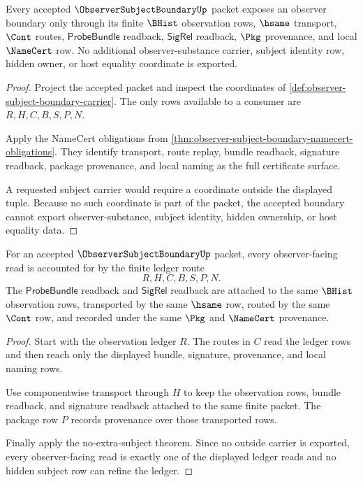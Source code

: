 \begin{theorem}
\label{thm:observer-subject-boundary-no-extra-subject}
Every accepted $\ObserverSubjectBoundaryUp$ packet exposes an observer boundary only through its finite $\BHist$ observation rows, $\hsame$ transport, $\Cont$ routes, $\mathsf{ProbeBundle}$ readback, $\mathsf{SigRel}$ readback, $\Pkg$ provenance, and local $\NameCert$ row. No additional observer-substance carrier, subject identity row, hidden owner, or host equality coordinate is exported.
\end{theorem}
\begin{proof}
Project the accepted packet and inspect the coordinates of \autoref{def:observer-subject-boundary-carrier}. The only rows available to a consumer are $R,H,C,B,S,P,N$.

Apply the NameCert obligations from \autoref{thm:observer-subject-boundary-namecert-obligations}. They identify transport, route replay, bundle readback, signature readback, package provenance, and local naming as the full certificate surface.

A requested subject carrier would require a coordinate outside the displayed tuple. Because no such coordinate is part of the packet, the accepted boundary cannot export observer-substance, subject identity, hidden ownership, or host equality data.
\end{proof}

\begin{theorem}
\label{thm:observer-subject-boundary-ledger-exactness}
For an accepted $\ObserverSubjectBoundaryUp$ packet, every observer-facing read is accounted for by the finite ledger route
$$
R,H,C,B,S,P,N.
$$
The $\mathsf{ProbeBundle}$ readback and $\mathsf{SigRel}$ readback are attached to the same $\BHist$ observation rows, transported by the same $\hsame$ row, routed by the same $\Cont$ row, and recorded under the same $\Pkg$ and $\NameCert$ provenance.
\end{theorem}
\begin{proof}
Start with the observation ledger $R$. The routes in $C$ read the ledger rows and then reach only the displayed bundle, signature, provenance, and local naming rows.

Use componentwise transport through $H$ to keep the observation rows, bundle readback, and signature readback attached to the same finite packet. The package row $P$ records provenance over those transported rows.

Finally apply the no-extra-subject theorem. Since no outside carrier is exported, every observer-facing read is exactly one of the displayed ledger reads and no hidden subject row can refine the ledger.
\end{proof}

